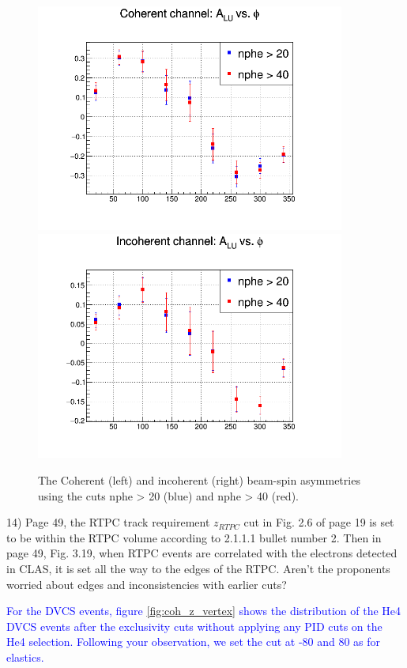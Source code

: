 \begin{figure}[tbp]
   \hspace{-1.0 cm}
\includegraphics[height=7.5cm]{fig/nphe_BSA_Coherent.png}
   \hspace{-1.0 cm}
\includegraphics[height=7.5cm]{fig/nphe_BSA_InCoherent.png}
\caption{The Coherent (left) and incoherent (right) beam-spin 
asymmetries using the cuts nphe > 20 (blue) and nphe > 40 (red). }
\label{fig:nphe_coh_incoh_alu}
\end{figure}


14) Page 49, the RTPC track requirement $z_{RTPC}$ cut in Fig. 2.6 of page 19 
is set to be within the RTPC volume according to  2.1.1.1 bullet number 2. Then 
in page 49, Fig. 3.19, when RTPC events are correlated with the electrons 
detected in CLAS, it is set all the way to the edges of the RTPC. Aren't the 
proponents worried about edges and inconsistencies with earlier cuts?

\textcolor{blue}{
  For the DVCS events, figure 
  \ref{fig:coh_z_vertex} shows the distribution of the He4 DVCS events after 
  the exclusivity cuts without applying any PID cuts on the He4 selection.  
  Following your observation, we set the cut at -80 and 80 as for elastics.}\\

